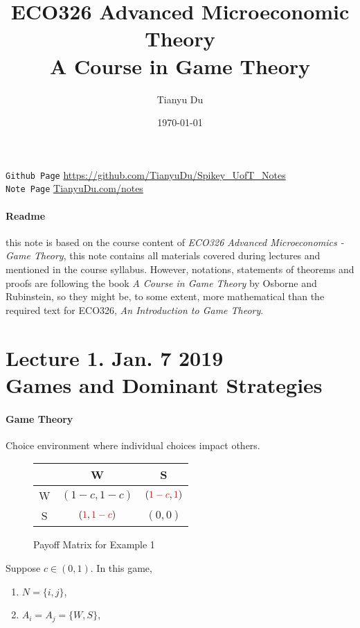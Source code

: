 \documentclass[11pt]{article}
\title{ECO326 Advanced Microeconomic Theory \\ \small A Course in Game Theory}
\author{Tianyu Du}
\date{\today}
\newcommand{\red}[1]{\textcolor{red}{#1}}
\begin{document}
	\maketitle
	\doclicenseThis
	\texttt{Github Page} \url{https://github.com/TianyuDu/Spikey_UofT_Notes}\\
	\texttt{Note Page} \url{TianyuDu.com/notes}
	\paragraph{Readme} this note is based on the course content of \emph{ECO326 Advanced Microeconomics - Game Theory}, this note contains all materials covered during lectures and mentioned in the course syllabus. However, notations, statements of theorems and proofs are following the book \emph{A Course in Game Theory} by Osborne and Rubinstein, so they might be, to some extent, more mathematical than the required text for ECO326, \emph{An Introduction to Game Theory}.
	
	\tableofcontents
	\newpage
	
	\section{Lecture 1. Jan. 7 2019\\Games and Dominant Strategies}
		\paragraph{Game Theory} Choice environment where individual choices impact others.
		
		\begin{example}
			\begin{figure}[h]
				\centering
				  \begin{tabular}{c|c|c}
				    & W & S\\
				    \hline
				    W & $(1-c, 1-c)$ & $(\red{1-c}, \red{1})$ \\
				    \hline
				    S & $(\red{1}, \red{1-c})$ & $(0, 0)$
				  \end{tabular}
				  \caption{Payoff Matrix for Example 1}
			\end{figure}
		\end{example}
		Suppose $c \in (0, 1)$. In this game,
		\begin{enumerate}[i]
			\item $N = \{i, j\}$,
			\item $A_i = A_j = \{W, S\}$,
		\end{enumerate}
		
\end{document}
